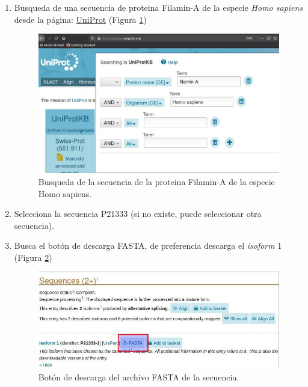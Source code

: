 \documentclass{article}
\begin{document}
\begin{enumerate}
    \item Busqueda de una secuencia de proteina Filamin-A de la especie \textit{Homo sapiens} desde la página: \href{https://www.uniprot.org/}{UniProt}  (Figura \ref{img:uniprot2})
    
    \begin{figure}[h]
     \centering
        \includegraphics[width=\textwidth,height=0.3\textheight,keepaspectratio]{img/alignment/uniprot2.jpg}
        \caption{Busqueda de la secuencia de la proteina Filamin-A de la especie Homo sapiens.}
         \label{img:uniprot2}
    \end{figure}
    
    \item Selecciona la secuencia  P21333 (si no existe, puede seleccionar otra secuencia).
    \item Busca el botón de descarga FASTA, de preferencia descarga el \textit{isoform} 1 (Figura \ref{img:uniprot4})
    
    \begin{figure}[h]
     \centering
        \includegraphics[width=\textwidth,height=0.2\textheight,keepaspectratio]{img/alignment/uniprot4.jpg}
        \caption{Botón de descarga del archivo FASTA de la secuencia.}
        \label{img:uniprot4}
    \end{figure}
    

\end{enumerate}
\end{document}
